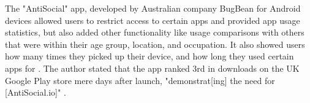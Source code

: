 \documentclass[12pt]{article}
\begin{document}



The "AntiSocial" app, developed by Australian company BugBean for Android devices allowed users to restrict access to 
certain apps and provided app usage statistics, but also added other functionality like usage comparisons
with others that were within their age group, location, and occupation. It also showed users how many 
times they picked up their device, and how long they used certain apps for 
\autocite{RefWorks:RefID:104-michael2017addicted}. The author stated that the app ranked 3rd in downloads on the 
UK Google Play store mere days after launch, "demonstrat[ing] the need 
for [AntiSocial.io]" \autocite{RefWorks:RefID:104-michael2017addicted}.\newline
\end{document}
